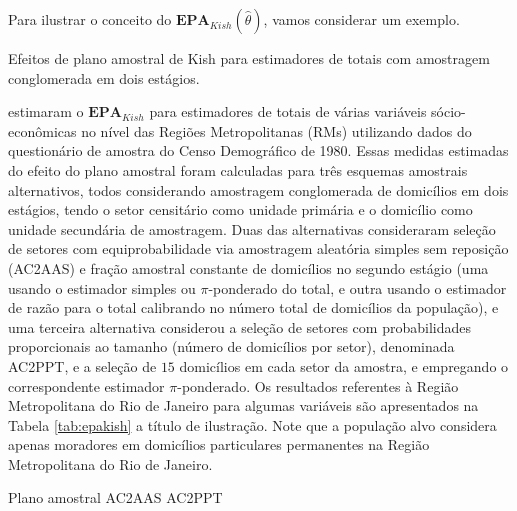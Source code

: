 \documentclass[]{book}
\theoremstyle{definition}
\theoremstyle{definition}
\theoremstyle{definition}
\theoremstyle{remark}
\let\BeginKnitrBlock\begin \let\EndKnitrBlock\end
\begin{document}
Para ilustrar o conceito do
\(\mathbf{EPA}_{Kish}\left( \hat{\theta}\right)\), vamos considerar um
exemplo.

\BeginKnitrBlock{example}
\protect\hypertarget{exm:epakish}{}{\label{exm:epakish} }Efeitos de plano
amostral de Kish para estimadores de totais com amostragem conglomerada
em dois estágios.
\EndKnitrBlock{example}

\citep{SilvaMou} estimaram o \(\mathbf{EPA}_{Kish}\) para estimadores de
totais de várias variáveis sócio-econômicas no nível das Regiões
Metropolitanas (RMs) utilizando dados do questionário de amostra do
Censo Demográfico de 1980. Essas medidas estimadas do efeito do plano
amostral foram calculadas para três esquemas amostrais alternativos,
todos considerando amostragem conglomerada de domicílios em dois
estágios, tendo o setor censitário como unidade primária e o domicílio
como unidade secundária de amostragem. Duas das alternativas
consideraram seleção de setores com equiprobabilidade via amostragem
aleatória simples sem reposição (AC2AAS) e fração amostral constante de
domicílios no segundo estágio (uma usando o estimador simples ou
\(\pi\)-ponderado do total, e outra usando o estimador de razão para o
total calibrando no número total de domicílios da população), e uma
terceira alternativa considerou a seleção de setores com probabilidades
proporcionais ao tamanho (número de domicílios por setor), denominada
AC2PPT, e a seleção de \(15\) domicílios em cada setor da amostra, e
empregando o correspondente estimador \(\pi\)-ponderado. Os resultados
referentes à Região Metropolitana do Rio de Janeiro para algumas
variáveis são apresentados na Tabela \ref{tab:epakish} a título de
ilustração. Note que a população alvo considera apenas moradores em
domicílios particulares permanentes na Região Metropolitana do Rio de
Janeiro.

Plano amostral AC2AAS AC2PPT
\end{document}
